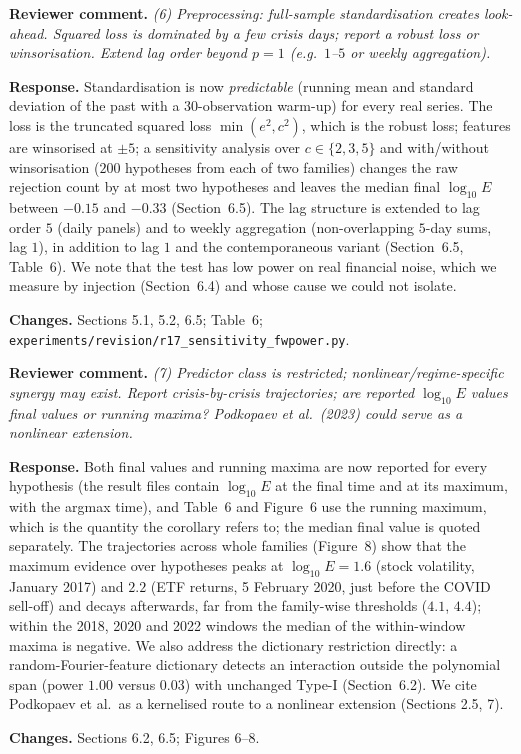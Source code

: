 \documentclass[11pt,a4paper]{article}
\newcommand{\rev}[1]{\par\noindent\textbf{Reviewer comment.} \emph{#1}}
\newcommand{\resp}{\par\noindent\textbf{Response.} }
\newcommand{\chg}{\par\noindent\textbf{Changes.} }
\begin{document}
\rev{(6) Preprocessing: full-sample standardisation creates look-ahead. Squared loss is dominated by a few crisis days; report a robust loss or winsorisation. Extend lag order beyond $p=1$ (e.g.\ $1$--$5$ or weekly aggregation).}
\resp Standardisation is now \emph{predictable} (running mean and standard deviation of the past with a $30$-observation warm-up) for every real series. The loss is the truncated squared loss $\min(e^2,c^2)$, which is the robust loss; features are winsorised at $\pm5$; a sensitivity analysis over $c\in\{2,3,5\}$ and with/without winsorisation ($200$ hypotheses from each of two families) changes the raw rejection count by at most two hypotheses and leaves the median final $\log_{10}E$ between $-0.15$ and $-0.33$ (Section~6.5). The lag structure is extended to lag order $5$ (daily panels) and to weekly aggregation (non-overlapping $5$-day sums, lag $1$), in addition to lag $1$ and the contemporaneous variant (Section~6.5, Table~6). We note that the test has low power on real financial noise, which we measure by injection (Section~6.4) and whose cause we could not isolate.
\chg Sections 5.1, 5.2, 6.5; Table~6; \texttt{experiments/revision/r17\_sensitivity\_fwpower.py}.

\rev{(7) Predictor class is restricted; nonlinear/regime-specific synergy may exist. Report crisis-by-crisis trajectories; are reported $\log_{10}E$ values final values or running maxima? Podkopaev et al.\ (2023) could serve as a nonlinear extension.}
\resp Both final values and running maxima are now reported for every hypothesis (the result files contain $\log_{10}E$ at the final time and at its maximum, with the argmax time), and Table~6 and Figure~6 use the running maximum, which is the quantity the corollary refers to; the median final value is quoted separately. The trajectories across whole families (Figure~8) show that the maximum evidence over hypotheses peaks at $\log_{10}E=1.6$ (stock volatility, January 2017) and $2.2$ (ETF returns, 5 February 2020, just before the COVID sell-off) and decays afterwards, far from the family-wise thresholds ($4.1$, $4.4$); within the 2018, 2020 and 2022 windows the median of the within-window maxima is negative. We also address the dictionary restriction directly: a random-Fourier-feature dictionary detects an interaction outside the polynomial span (power $1.00$ versus $0.03$) with unchanged Type-I (Section~6.2). We cite Podkopaev et al.\ as a kernelised route to a nonlinear extension (Sections 2.5, 7).
\chg Sections 6.2, 6.5; Figures 6--8.
\end{document}
